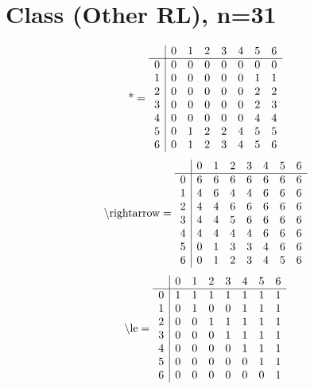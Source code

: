 \documentclass[11pt]{article}
\begin{document}
\section{Class (Other RL), n=31}
\[\text{*} = 
\begin{array}{r | r r r r r r r}
 & 0 & 1 & 2 & 3 & 4 & 5 & 6 \\ \hline
0 & 0 & 0 & 0 & 0 & 0 & 0 & 0 \\
1 & 0 & 0 & 0 & 0 & 0 & 1 & 1 \\
2 & 0 & 0 & 0 & 0 & 0 & 2 & 2 \\
3 & 0 & 0 & 0 & 0 & 0 & 2 & 3 \\
4 & 0 & 0 & 0 & 0 & 0 & 4 & 4 \\
5 & 0 & 1 & 2 & 2 & 4 & 5 & 5 \\
6 & 0 & 1 & 2 & 3 & 4 & 5 & 6 \\
\end{array}
\]
\[\text{\textbackslash rightarrow} = 
\begin{array}{r | r r r r r r r}
 & 0 & 1 & 2 & 3 & 4 & 5 & 6 \\ \hline
0 & 6 & 6 & 6 & 6 & 6 & 6 & 6 \\
1 & 4 & 6 & 4 & 4 & 6 & 6 & 6 \\
2 & 4 & 4 & 6 & 6 & 6 & 6 & 6 \\
3 & 4 & 4 & 5 & 6 & 6 & 6 & 6 \\
4 & 4 & 4 & 4 & 4 & 6 & 6 & 6 \\
5 & 0 & 1 & 3 & 3 & 4 & 6 & 6 \\
6 & 0 & 1 & 2 & 3 & 4 & 5 & 6 \\
\end{array}
\]
\[\text{\textbackslash le} = 
\begin{array}{r | r r r r r r r}
 & 0 & 1 & 2 & 3 & 4 & 5 & 6 \\ \hline
0 & 1 & 1 & 1 & 1 & 1 & 1 & 1 \\
1 & 0 & 1 & 0 & 0 & 1 & 1 & 1 \\
2 & 0 & 0 & 1 & 1 & 1 & 1 & 1 \\
3 & 0 & 0 & 0 & 1 & 1 & 1 & 1 \\
4 & 0 & 0 & 0 & 0 & 1 & 1 & 1 \\
5 & 0 & 0 & 0 & 0 & 0 & 1 & 1 \\
6 & 0 & 0 & 0 & 0 & 0 & 0 & 1 \\
\end{array}
\]
\end{document}

